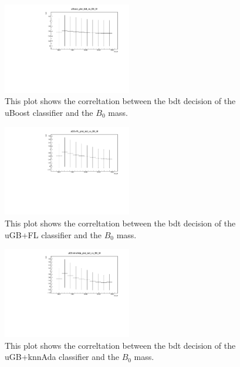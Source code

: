 \documentclass[english]{uzhpub}
\begin{document}
\begin{figure}[H]
  \centering
  \includegraphics[width=0.5\textwidth]{plots/uBoost_plot_bdt_vs_B0_M}
  \caption{This plot shows the correltation between the bdt decision of the uBoost classifier and the $B_0$ mass.}
  \label{fig:uBoostB0M}
\end{figure}

\begin{figure}[H]
  \centering
  \includegraphics[width=0.5\textwidth]{plots/uGB+FL_plot_bdt_vs_B0_M}
  \caption{This plot shows the correltation between the bdt decision of the uGB+FL classifier and the $B_0$ mass.}
  \label{fig:uGB+FLB0M}
\end{figure}

\begin{figure}[H]
  \centering
  \includegraphics[width=0.5\textwidth]{plots/uGB+knnAda_plot_bdt_vs_B0_M}
  \caption{This plot shows the correltation between the bdt decision of the uGB+knnAda classifier and the $B_0$ mass.}
  \label{fig:uGB+knnAdaB0M}
\end{figure}
\end{document}
